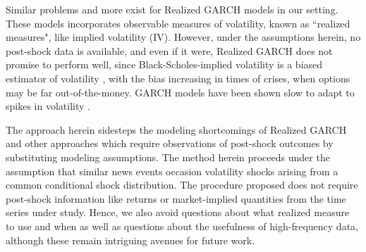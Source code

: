 \documentclass{uiucthesis2021}
\theoremstyle{definition}
\begin{document}
Similar problems and more exist for Realized GARCH models \parencite[][]{hansen2012realized} in our setting. These models incorporates observable measures of volatility, known as  ``realized measures", like implied volatility (IV). However, under the assumptions herein, no post-shock data is available, and even if it were, Realized GARCH does not promise to perform well, since Black-Scholes-implied volatility is a biased estimator of volatility \parencite[][]{mayhew1995implied, christensen1998relation}, with the bias increasing in times of crises, when options may be far out-of-the-money.  GARCH models have been shown slow to adapt to spikes in volatility \parencite[][]{andersen2003modeling}.

The approach herein sidesteps the modeling shortcomings of Realized GARCH and other approaches which require observations of post-shock outcomes
by substituting modeling assumptions.  The method herein proceeds under the assumption that similar news events occasion volatility shocks arising from a common conditional shock distribution.  The procedure proposed does not require post-shock information like returns or market-implied quantities from the time series under study.  Hence, we also avoid questions about what realized measure to use and when as well as questions about the usefulness of high-frequency data, although these remain intriguing avenues for future work.
\end{document}
